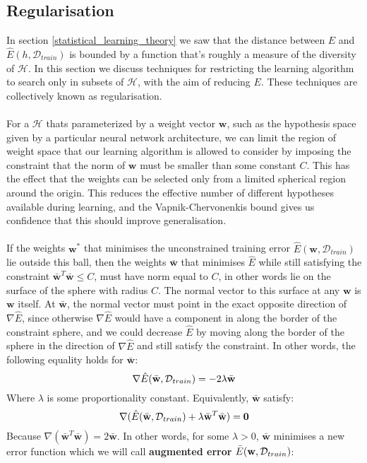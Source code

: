 \subsection{Regularisation}
In section \ref{statistical_learning_theory} we saw that the distance between $E$ and $\hat{E}(h, \mathcal{D}_{train})$ is bounded by a function that's roughly a measure of the diversity of $\mathcal{H}$. In this section we discuss techniques for restricting the learning algorithm to search only in subsets of $\mathcal{H}$, with the aim of reducing $E$. These techniques are collectively known as regularisation.
\\\\
For a $\mathcal{H}$ thats parameterized by a weight vector $\mathbf{w}$, such as the hypothesis space given by a particular neural network architecture, we can limit the region of weight space that our learning algorithm is allowed to consider by imposing the constraint that the norm of $\mathbf{w}$ must be smaller than some constant $C$. This has the effect that the weights can be selected only from a limited spherical region around the origin. This reduces the effective number of different hypotheses available during learning, and the Vapnik-Chervonenkis bound gives us confidence that this should improve generalisation.
\\\\
If the weights $\mathbf{w}^*$ that minimises the unconstrained training error $\hat{E}(\mathbf{w}, \mathcal{D}_{train})$ lie outside this ball, then the weights $\bar{\mathbf{w}}$ that minimises $\hat{E}$ while still satisfying the constraint $\bar{\mathbf{w}}^T\bar{\mathbf{w}} \leq C$, must have norm equal to $C$, in other words lie on the surface of the sphere with radius $C$. The normal vector to this surface at any $\mathbf{w}$ is $\mathbf{w}$ itself. At $\bar{\mathbf{w}}$, the normal vector must point in the exact opposite direction of $\nabla \hat{E}$, since otherwise $\nabla \hat{E}$ would have a component in along the border of the constraint sphere, and we could decrease $\hat{E}$ by moving along the border of the sphere in the direction of $\nabla \hat{E}$ and still satisfy the constraint. In other words, the following equality holds for $\bar{\mathbf{w}}$:
$$
\nabla \hat{E}(\bar{\mathbf{w}}, \mathcal{D}_{train}) = -2\lambda\bar{\mathbf{w}}
$$
Where $\lambda$ is some proportionality constant. Equivalently, $\bar{\mathbf{w}}$ satisfy:
$$
\nabla (\hat{E}(\bar{\mathbf{w}}, \mathcal{D}_{train}) + \lambda\bar{\mathbf{w}}^T\bar{\mathbf{w}}) = \mathbf{0}
$$
Because $\nabla(\bar{\mathbf{w}}^T\bar{\mathbf{w}}) = 2\bar{\mathbf{w}}$. In other words, for some $\lambda > 0$, $\bar{\mathbf{w}}$ minimises a new error function which we will call \textbf{augmented error} $\bar{E}(\mathbf{w}, \mathcal{D}_{train})$:
